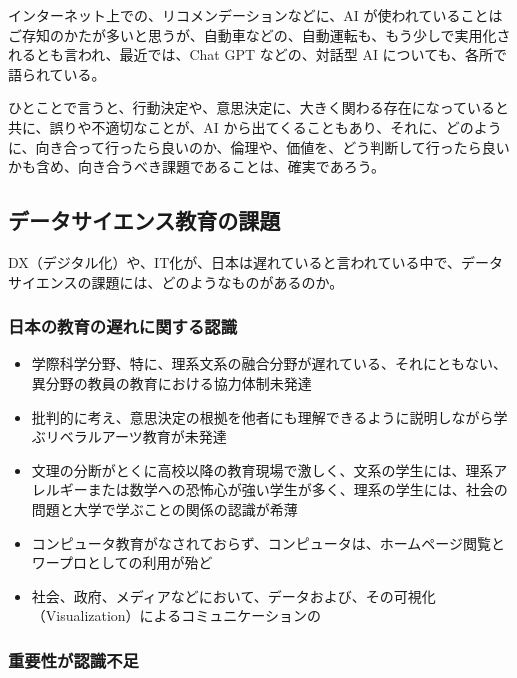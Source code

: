 \documentclass[
]{book}
\providecommand{\tightlist}{%
  \setlength{\itemsep}{0pt}\setlength{\parskip}{0pt}}
\theoremstyle{definition}
\theoremstyle{definition}
\theoremstyle{definition}
\theoremstyle{definition}
\theoremstyle{remark}
\begin{document}
インターネット上での、リコメンデーションなどに、AI が使われていることはご存知のかたが多いと思うが、自動車などの、自動運転も、もう少しで実用化されるとも言われ、最近では、Chat GPT などの、対話型 AI についても、各所で語られている。

ひとことで言うと、行動決定や、意思決定に、大きく関わる存在になっていると共に、誤りや不適切なことが、AI から出てくることもあり、それに、どのように、向き合って行ったら良いのか、倫理や、価値を、どう判断して行ったら良いかも含め、向き合うべき課題であることは、確実であろう。

\hypertarget{ux30c7ux30fcux30bfux30b5ux30a4ux30a8ux30f3ux30b9ux6559ux80b2ux306eux8ab2ux984c}{%
\subsection{データサイエンス教育の課題}\label{ux30c7ux30fcux30bfux30b5ux30a4ux30a8ux30f3ux30b9ux6559ux80b2ux306eux8ab2ux984c}}

DX（デジタル化）や、IT化が、日本は遅れていると言われている中で、データサイエンスの課題には、どのようなものがあるのか。

\hypertarget{ux65e5ux672cux306eux6559ux80b2ux306eux9045ux308cux306bux95a2ux3059ux308bux8a8dux8b58}{%
\subsubsection{日本の教育の遅れに関する認識}\label{ux65e5ux672cux306eux6559ux80b2ux306eux9045ux308cux306bux95a2ux3059ux308bux8a8dux8b58}}

\begin{itemize}
\tightlist
\item
  学際科学分野、特に、理系文系の融合分野が遅れている、それにともない、異分野の教員の教育における協力体制未発達
\item
  批判的に考え、意思決定の根拠を他者にも理解できるように説明しながら学ぶリベラルアーツ教育が未発達
\item
  文理の分断がとくに高校以降の教育現場で激しく、文系の学生には、理系アレルギーまたは数学への恐怖心が強い学生が多く、理系の学生には、社会の問題と大学で学ぶことの関係の認識が希薄
\item
  コンピュータ教育がなされておらず、コンピュータは、ホームページ閲覧とワープロとしての利用が殆ど
\item
  社会、政府、メディアなどにおいて、データおよび、その可視化（Visualization）によるコミュニケーションの
\end{itemize}

\hypertarget{ux91cdux8981ux6027ux304cux8a8dux8b58ux4e0dux8db3}{%
\subsubsection{重要性が認識不足}\label{ux91cdux8981ux6027ux304cux8a8dux8b58ux4e0dux8db3}}
\end{document}
